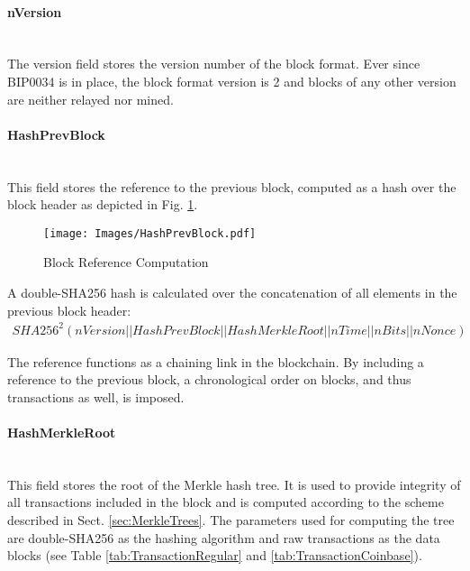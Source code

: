 \vspace{-30pt}
\clearpage

\paragraph{nVersion}~\\
The version field stores the version number of the block format. Ever since BIP0034 \cite{BIP0034} is in place, the block format version is 2 and blocks of any other version are neither relayed nor mined.

\paragraph{HashPrevBlock}~\\
This field stores the reference to the previous block, computed as a hash over the block header as depicted in Fig. \ref{fig:HashPrevBlock}.
\begin{figure}[ht!]
 \centering
 \texttt{[image: Images/HashPrevBlock.pdf]}
 \caption{Block Reference Computation} \label{fig:HashPrevBlock}
\end{figure}

\noindent
A double-SHA256 hash is calculated over the concatenation of all elements in the previous block header:
\begin{equation}
\begin{aligned}
SHA256^{2}(nVersion||HashPrevBlock||HashMerkleRoot||nTime||nBits||nNonce)
\label{eqn:HashPrevBlock}
\end{aligned}
\end{equation}

\noindent
The reference functions as a chaining link in the blockchain. By including a reference to the previous block, a chronological order on blocks, and thus transactions as well, is imposed.


\paragraph{HashMerkleRoot}~\\
This field stores the root of the Merkle hash tree. It is used to provide integrity of all transactions included in the block and is computed according to the scheme described in Sect. \ref{sec:MerkleTrees}. The parameters used for computing the tree are double-SHA256 as the hashing algorithm and raw transactions as the data blocks (see Table \ref{tab:TransactionRegular} and \ref{tab:TransactionCoinbase}).


